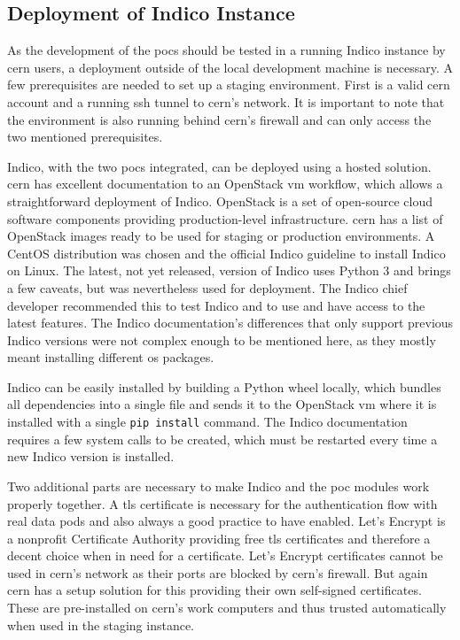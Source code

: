 \subsection{Deployment of Indico Instance}

As the development of the \glspl{poc} should be tested in a running Indico instance by \gls{cern} users, a deployment outside of the local development machine is necessary. A few prerequisites are needed to set up a staging environment. First is a valid \gls{cern} account and a running \gls{ssh} tunnel to \gls{cern}'s network. It is important to note that the environment is also running behind \gls{cern}'s firewall and can only access the two mentioned prerequisites.

Indico, with the two \glspl{poc} integrated, can be deployed using a hosted solution. \gls{cern} has excellent documentation to an OpenStack \gls{vm} \cite{openstack} workflow, which allows a straightforward deployment of Indico. OpenStack is a set of open-source cloud software components providing production-level infrastructure. \gls{cern} has a list of OpenStack images ready to be used for staging or production environments. A CentOS \cite{centos} distribution was chosen and the official Indico guideline to install Indico on Linux. The latest, not yet released, version of Indico uses Python 3 and brings a few caveats, but was nevertheless used for deployment. The Indico chief developer recommended this to test Indico and to use and have access to the latest features. The Indico documentation's differences that only support previous Indico versions were not complex enough to be mentioned here, as they mostly meant installing different \gls{os} packages.

Indico can be easily installed by building a Python wheel locally, which bundles all dependencies into a single file and sends it to the OpenStack \gls{vm} where it is installed with a single \texttt{pip install} command. The Indico documentation requires a few system calls to be created, which must be restarted every time a new Indico version is installed.

Two additional parts are necessary to make Indico and the \gls{poc} modules work properly together. A \gls{tls} certificate is necessary for the authentication flow with real data pods and also always a good practice to have enabled. Let's Encrypt \cite{letsencrypt} is a nonprofit Certificate Authority providing free \gls{tls} certificates and therefore a decent choice when in need for a certificate. Let's Encrypt certificates cannot be used in \gls{cern}'s network as their ports are blocked by \gls{cern}'s firewall. But again \gls{cern} has a setup solution for this providing their own self-signed certificates. These are pre-installed on \gls{cern}'s work computers and thus trusted automatically when used in the staging instance.

